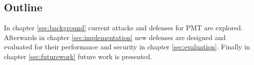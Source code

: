 \subsection{Outline}
In chapter \ref{sec:background} current attacks and defenses for PMT are explored. Afterwards in chapter \ref{sec:implementation} new defenses are designed and evaluated for their performance and security in chapter \ref{sec:evaluation}. Finally in chapter \ref{sec:futurework} future work is presented.